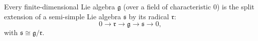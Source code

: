 Every finite-dimensional Lie algebra $\mathfrak{g}$ (over a field of characteristic $0$) is the split extension of a semi-simple Lie algebra $\mathfrak{s}$ by its radical $\mathfrak{r}$:
$$0 \rightarrow \mathfrak{r} \rightarrow \mathfrak{g} \rightarrow \mathfrak{s} \rightarrow 0,$$
with $\mathfrak{s} \cong \mathfrak{g}/\mathfrak{r}$.
